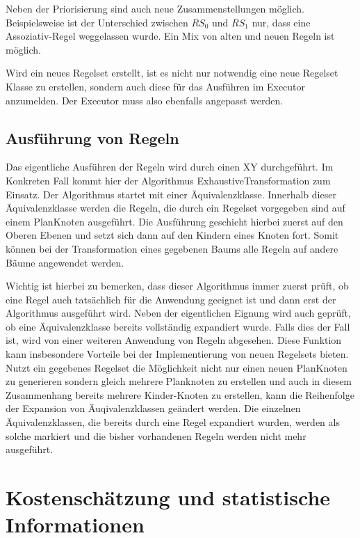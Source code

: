 Neben der Priorisierung sind auch neue Zusammenstellungen möglich. Beispielsweise ist der Unterschied zwischen $RS_0$ und $RS_1$ nur, dass eine Assoziativ-Regel weggelassen wurde. Ein Mix von alten und neuen Regeln ist möglich.

Wird ein neues Regelset erstellt, ist es nicht nur notwendig eine neue Regelset Klasse zu erstellen, sondern auch diese für das Ausführen im Executor anzumelden. Der Executor muss also ebenfalls angepasst werden.



\subsection{Ausführung von Regeln}

Das eigentliche Ausführen der Regeln wird durch einen XY durchgeführt. Im Konkreten Fall kommt hier der Algorithmus ExhaustiveTransformation zum Einsatz. Der Algorithmus startet mit einer Äquivalenzklasse. Innerhalb dieser Äquivalenzklasse werden die Regeln, die durch ein Regelset vorgegeben sind auf einem PlanKnoten ausgeführt. Die Ausführung geschieht hierbei zuerst auf den Oberen Ebenen und setzt sich dann auf den Kindern eines Knoten fort. Somit können bei der Transformation eines gegebenen Baums alle Regeln auf andere Bäume angewendet werden.

Wichtig ist hierbei zu bemerken, dass dieser Algorithmus immer zuerst prüft, ob eine Regel auch tatsächlich für die Anwendung geeignet ist und dann erst der Algorithmus ausgeführt wird. Neben der eigentlichen Eignung wird auch geprüft, ob eine Äquivalenzklasse bereits vollständig expandiert wurde. Falls dies der Fall ist, wird von einer weiteren Anwendung von Regeln abgesehen. Diese Funktion kann insbesondere Vorteile bei der Implementierung von neuen Regelsets bieten. Nutzt ein gegebenes Regelset die Möglichkeit nicht nur einen neuen PlanKnoten zu generieren sondern gleich mehrere Planknoten zu erstellen und auch in diesem Zusammenhang bereits mehrere Kinder-Knoten zu erstellen, kann die Reihenfolge der Expansion von Äuqivalenzklassen geändert werden. Die einzelnen Äquivalenzklassen, die bereits durch eine Regel expandiert wurden, werden als solche markiert und die bisher vorhandenen Regeln werden nicht mehr ausgeführt.


\section{Kostenschätzung und statistische Informationen}



